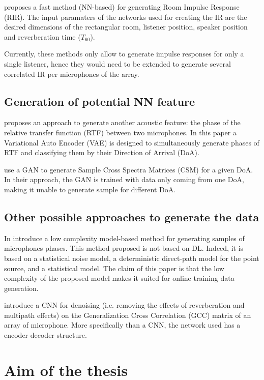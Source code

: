 \documentclass[11pt,a4paper,twoside]{report}
\begin{document}
\cite{ratnarajah2021fast} proposes a fast method (NN-based) for generating Room Impulse Response (RIR). The input paramaters of the networks used for creating the IR are the desired dimensions of the rectangular room, listener position, speaker position and reverberation time ($T_{60}$).

Currently, these methods only allow to generate impulse responses for only a single listener, hence they would need to be extended to generate several correlated IR per microphones of the array.

\subsection{Generation of potential NN feature}

\cite{bianco2020semi} proposes an approach to generate another acoustic feature: the phase of the relative transfer function (RTF) between two microphones. In this paper a Variational Auto Encoder (VAE) is designed to simultaneously generate phases of RTF and classifying them by their Direction of Arrival (DoA).

\cite{gerstoft2020parametric} use a GAN to generate Sample Cross Spectra Matrices (CSM) for a given DoA. In their approach, the GAN is trained with data only coming from one DoA, making it unable to generate sample for different DoA.

\subsection{Other possible approaches to generate the data}

In \cite{hubner2021efficient} introduce a low complexity model-based method for generating samples of microphones phases. This method proposed is not based on DL. Indeed, it is based on a statistical noise model, a deterministic direct-path model for the point source, and a statistical model. The claim of this paper is that the low complexity of the proposed  model makes it suited for online training data generation. 

\cite{vera2021acoustic} introduce a CNN for denoising (i.e. removing the effects of reverberation and multipath effects) on the Generalization Cross Correlation (GCC) matrix of an array of microphone. More specifically than a CNN, the network used has a encoder-decoder structure.

\section{Aim of the thesis}
\end{document}
